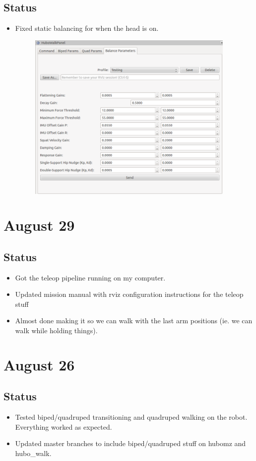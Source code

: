 \documentclass[letterpaper, 10 pt]{report}
\begin{document}
\subsection*{Status}
\begin{itemize}
  \item Fixed static balancing for when the head is on.
  \newline
  \begin{figure}[h]
  \centering
  \includegraphics[width=10.0cm]{resources/static-balance-gains-with-head}
  \end{figure}
\end{itemize}

\section*{August 29}
\subsection*{Status}
\begin{itemize}
  \item Got the teleop pipeline running on my computer.
  \item Updated mission manual with rviz configuration instructions for the teleop stuff
  \item Almost done making it so we can walk with the last arm positions (ie. we can walk while holding things).
\end{itemize}

\section*{August 26}
\subsection*{Status}
\begin{itemize}
\item Tested biped/quadruped transitioning and quadruped walking on the robot. Everything worked as expected.
\item Updated master branches to include biped/quadruped stuff on hubomz and hubo\_walk.
\end{itemize}
\end{document}
